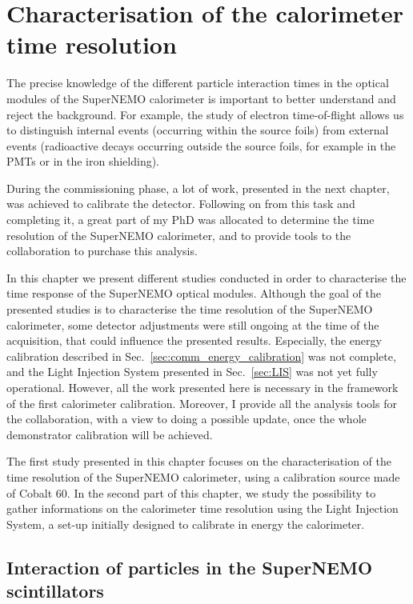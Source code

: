 \chapter{Characterisation of the calorimeter time resolution}
\label{ch:Cobalt_study}

The precise knowledge of the different particle interaction times in the optical modules of the SuperNEMO calorimeter is important to better understand and reject the background.
For example, the study of electron time-of-flight allows us to distinguish internal events (occurring within the source foils) from external events (radioactive decays occurring outside the source foils, for example in the PMTs or in the iron shielding).

During the commissioning phase, a lot of work, presented in the next chapter, was achieved to calibrate the detector.
Following on from this task and completing it, a great part of my PhD was allocated to determine the time resolution of the SuperNEMO calorimeter, and to provide tools to the collaboration to purchase this analysis.

In this chapter we present different studies conducted in order to characterise the time response of the SuperNEMO optical modules.
Although the goal of the presented studies is to characterise the time resolution of the SuperNEMO calorimeter, some detector adjustments were still ongoing at the time of the acquisition, that could influence the presented results.
Especially, the energy calibration described in Sec.~\ref{sec:comm_energy_calibration} was not complete, and the Light Injection System presented in Sec.~\ref{sec:LIS} was not yet fully operational.
However, all the work presented here is necessary in the framework of the first calorimeter calibration.
Moreover, I provide all the analysis tools for the collaboration, with a view to doing a possible update, once the whole demonstrator calibration will be achieved.

The first study presented in this chapter focuses on the characterisation of the time resolution of the SuperNEMO calorimeter, using a calibration source made of Cobalt $60$.
In the second part of this chapter, we study the possibility to gather informations on the calorimeter time resolution using the Light Injection System, a set-up initially designed to calibrate in energy the calorimeter.

\section{Interaction of particles in the SuperNEMO scintillators}
\label{sec:scintillator_interactions}

